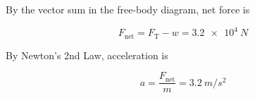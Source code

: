 \documentclass{exam}
\begin{document}
\begin{questions}
\begin{solution}
By the vector sum in the free-body diagram, net force is

\begin{equation*}
    F_{\mathrm{net}} = F_{\text{T}} - w = \SI{3.2e4}{N}
\end{equation*}

By Newton's 2nd Law, acceleration is

\begin{equation*}
   a = \frac{F_{\mathrm{net}}}{m} = \SI{3.2}{m/s^2}
\end{equation*}

\end{solution}






\end{questions}
\end{document}
